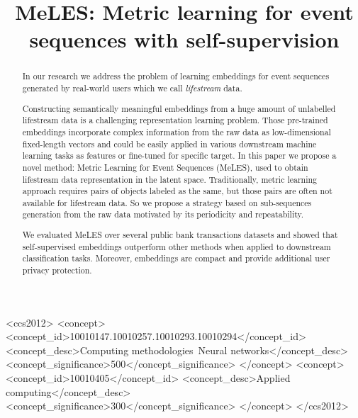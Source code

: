 \documentclass[sigconf, anonymous]{acmart}
\begin{document}
\title{MeLES: Metric learning for event sequences with self-supervision}

\begin{abstract}

In our research we address the problem of learning embeddings for event sequences generated by real-world users which we call \emph{lifestream} data.

Constructing semantically meaningful embeddings from a huge amount of unlabelled lifestream data is a challenging representation learning problem. Those pre-trained embeddings incorporate complex information from the raw data as low-dimensional fixed-length vectors and could be easily applied in various downstream machine learning tasks as features or fine-tuned for specific target. In this paper we propose a novel method: Metric Learning for Event Sequences (MeLES), used to obtain lifestream data representation in the latent space. Traditionally, metric learning approach requires pairs of objects labeled as the same, but those pairs are often not available for lifestream data. So we propose a strategy based on sub-sequences generation from the raw data motivated by its periodicity and repeatability.

We evaluated MeLES over several public bank transactions datasets and showed that self-supervised embeddings outperform other methods when applied to downstream classification tasks. Moreover, embeddings are compact and provide additional user privacy protection.


\end{abstract}

\begin{CCSXML}
<ccs2012>
<concept>
<concept_id>10010147.10010257.10010293.10010294</concept_id>
<concept_desc>Computing methodologies~Neural networks</concept_desc>
<concept_significance>500</concept_significance>
</concept>
<concept>
<concept_id>10010405</concept_id>
<concept_desc>Applied computing</concept_desc>
<concept_significance>300</concept_significance>
</concept>
</ccs2012>
\end{CCSXML}



\maketitle
\end{document}
